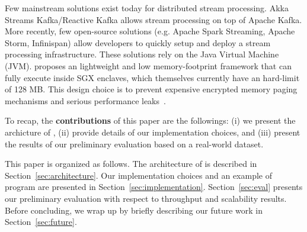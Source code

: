 Few mainstream solutions exist today for distributed stream processing.
Akka Streams Kafka/Reactive Kafka\cite{reactivekafka} allows stream processing on top of Apache Kafka\cite{apachekafka}.
More recently, few open-source solutions (e.g. Apache Spark Streaming\cite{apachesparkstreaming}, Apache Storm\cite{apachestorm}, Infinispan\cite{infinispan}) allow developers to quickly setup and deploy a stream processing infrastructure. 
These solutions rely on the Java Virtual Machine (JVM)\cite{}.
\SYS proposes an lightweight and low memory-footprint framework that can fully execute inside SGX enclaves, which themselves currently have an hard-limit of 128 MB.
This design choice is to prevent expensive encrypted memory paging mechanisms and serious performance leaks~\cite{brenner_securekeeper:_2016}.  

To recap, the \textbf{contributions} of this paper are the followings: (i) we present the archicture of \SYS, (ii) provide details of our implementation choices, and (iii) present the results of our preliminary evaluation based on a real-world dataset. 

This paper is organized as follows. 
The architecture of \SYS is described in Section~\ref{sec:architecture}.
Our implementation choices and an example of \SYS program are presented in Section~\ref{sec:implementation}.
Section~\ref{sec:eval} presents our preliminary evaluation with respect to throughput and scalability results.
Before concluding, we wrap up by briefly describing our future work in Section~\ref{sec:future}. 